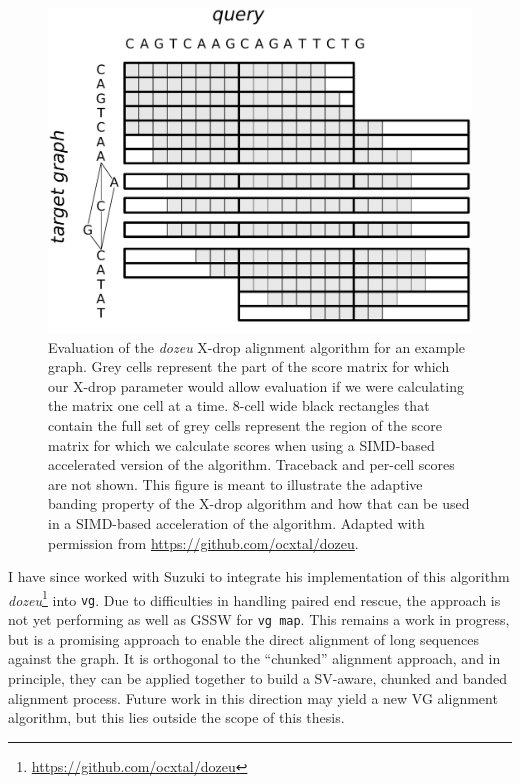 \begin{figure}[htbp!] 
\centering    
\includegraphics[width=1.0\textwidth]{Chapter2/Figs/xdrop.pdf}
\caption[The \emph{dozeu} X-drop alignment algorithm]{
  Evaluation of the \emph{dozeu} X-drop alignment algorithm for an example graph.
  Grey cells represent the part of the score matrix for which our X-drop parameter would allow evaluation if we were calculating the matrix one cell at a time.
  8-cell wide black rectangles that contain the full set of grey cells represent the region of the score matrix for which we calculate scores when using a SIMD-based accelerated version of the algorithm.
  Traceback and per-cell scores are not shown.
  This figure is meant to illustrate the adaptive banding property of the X-drop algorithm and how that can be used in a SIMD-based acceleration of the algorithm.
  Adapted with permission from \url{https://github.com/ocxtal/dozeu}.
}
\label{fig:xdrop}
\end{figure}

I have since worked with Suzuki to integrate his implementation of this algorithm \emph{dozeu}\footnote{\url{https://github.com/ocxtal/dozeu}} into {\tt vg}.
Due to difficulties in handling paired end rescue, the approach is not yet performing as well as GSSW for {\tt vg map}.
This remains a work in progress, but is a promising approach to enable the direct alignment of long sequences against the graph.
It is orthogonal to the ``chunked'' alignment approach, and in principle, they can be applied together to build a SV-aware, chunked and banded alignment process.
Future work in this direction may yield a new VG alignment algorithm, but this lies outside the scope of this thesis.

